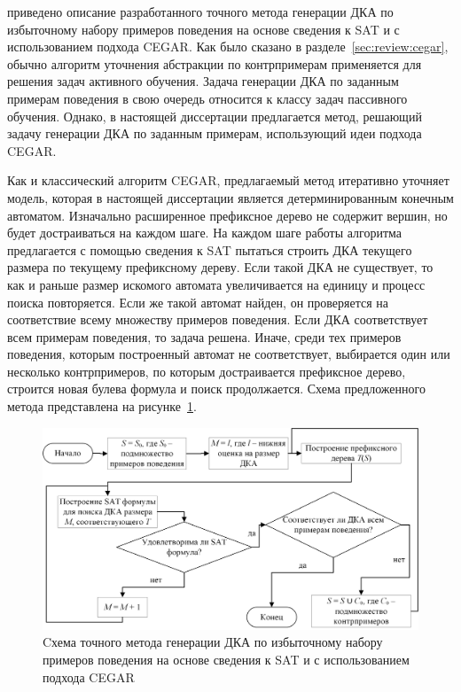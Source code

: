 \insection{\ref{sec:cegar:cegar-algo}} приведено описание разработанного точного метода генерации ДКА по избыточному набору примеров поведения на основе сведения к SAT и с использованием подхода CEGAR. 
Как было сказано в разделе~\ref{sec:review:cegar}, обычно алгоритм уточнения абстракции по контрпримерам применяется для решения задач активного обучения. 
Задача генерации ДКА по заданным примерам поведения в свою очередь относится к классу задач пассивного обучения.
Однако, в настоящей диссертации предлагается метод, решающий задачу генерации ДКА по заданным примерам, использующий идеи подхода CEGAR.

Как и классический алгоритм CEGAR, предлагаемый метод итеративно уточняет модель, которая в настоящей диссертации является детерминированным конечным автоматом.
Изначально расширенное префиксное дерево не содержит вершин, но будет достраиваться на каждом шаге.
На каждом шаге работы алгоритма предлагается с помощью сведения к SAT пытаться строить ДКА текущего размера по текущему префиксному дереву.
Если такой ДКА не существует, то как и раньше размер искомого автомата увеличивается на единицу и процесс поиска повторяется.
Если же такой автомат найден, он проверяется на соответствие всему множеству примеров поведения.
Если ДКА соответствует всем примерам поведения, то задача решена.
Иначе, среди тех примеров поведения, которым построенный автомат не соответствует, выбирается один или несколько контрпримеров, по которым достраивается префиксное дерево, строится новая булева формула и поиск продолжается.
Схема предложенного метода представлена на рисунке~\ref{syn:img:cegar-algo}.

\begin{figure}[ht]
  \centering
  \includegraphics[scale=0.5]{img/ntv/cegar.jpg}
  \caption{Cхема точного метода генерации ДКА по избыточному набору примеров поведения на основе сведения к SAT и с использованием подхода CEGAR}
  \label{syn:img:cegar-algo}
\end{figure}

